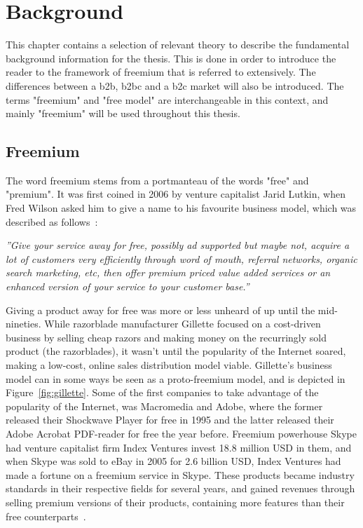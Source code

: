 \chapter{Background}
This chapter contains a selection of relevant theory to describe the fundamental background information for the thesis. This is done in order to introduce the reader to the framework of freemium that is referred to extensively. The differences between a \gls{b2b}, \gls{b2bc} and a \gls{b2c} market will also be introduced. The terms "freemium" and "free model" are interchangeable in this context, and mainly "freemium" will be used throughout this thesis.
\section{Freemium}
The word freemium stems from a portmanteau of the words "free" and "premium". It was first coined in 2006 by venture capitalist Jarid Lutkin, when Fred Wilson asked him to give a name to his favourite business model, which was described as follows~\cite{fredwilson20062}:
\begin{displayquote}
\textit{''Give your service away for free, possibly ad supported but maybe not,
acquire a lot of customers very efficiently through word of mouth,
referral networks, organic search marketing, etc, then offer premium
priced value added services or an enhanced version of your service to
your customer base.''}
\end{displayquote}

Giving a product away for free was more or less unheard of up until the mid-nineties. While razorblade manufacturer Gillette focused on a cost-driven business by selling cheap razors and making money on the recurringly sold product (the razorblades), it wasn't until the popularity of the Internet soared, making a low-cost, online sales distribution model viable. Gillette's business model can in some ways be seen as a proto-freemium model, and is depicted in Figure~\ref{fig:gillette}. Some of the first companies to take advantage of the popularity of the Internet, was Macromedia and Adobe, where the former released their Shockwave Player for free in 1995 and the latter released their Adobe Acrobat PDF-reader for free the year before. Freemium powerhouse Skype had venture capitalist firm Index Ventures invest 18.8 million USD in them, and when Skype was sold to eBay in 2005 for 2.6 billion USD, Index Ventures had made a fortune on a freemium service in Skype.  These products became industry standards in their respective fields for several years, and gained revenues through selling premium versions of their products, containing more features than their free counterparts~\cite{katherineheires2007}. 


